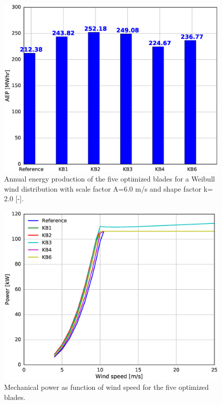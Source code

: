 \begin{figure}[!ht]
\begin{center}
	\includegraphics[width=.85\linewidth]{figures/KBcomp_AEPcomp.eps}
\end{center}
\caption{Annual energy production of the five optimized blades for a Weibull wind distribution with scale factor A=6.0 m/s and shape factor k= 2.0 [-].}
\label{fig:KB_AEP}
\end{figure}

\begin{figure}[!ht]
\begin{center}
	\includegraphics[width=.85\linewidth]{figures/KBcomp_power.eps}
\end{center}
\caption{Mechanical power as function of wind speed for the five optimized blades.}
\label{fig:power}
\end{figure}

